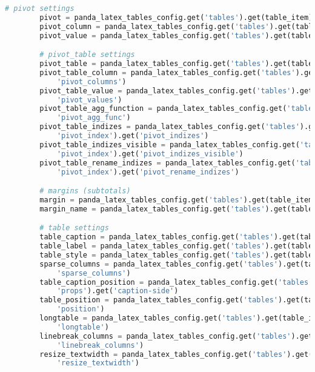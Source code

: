 \begin{lstlisting}[language=python, caption=pandas_dataframe_to_latex_table.py CSV - LaTex Tabelle,captionpos=b,label={lst:Python LaTex - pandas_dataframe_to_latex_table},breaklines=true]
        # pivot settings
        pivot = panda_latex_tables_config.get('tables').get(table_item).get('pivot')
        pivot_column = panda_latex_tables_config.get('tables').get(table_item).get('pivot_columns')
        pivot_value = panda_latex_tables_config.get('tables').get(table_item).get('pivot_values')

        # pivot_table settings
        pivot_table = panda_latex_tables_config.get('tables').get(table_item).get('pivot_table')
        pivot_table_column = panda_latex_tables_config.get('tables').get(table_item).get('pivot_table').get(
            'pivot_columns')
        pivot_table_value = panda_latex_tables_config.get('tables').get(table_item).get('pivot_table').get(
            'pivot_values')
        pivot_table_agg_function = panda_latex_tables_config.get('tables').get(table_item).get('pivot_table').get(
            'pivot_agg_func')
        pivot_table_indizes = panda_latex_tables_config.get('tables').get(table_item).get('pivot_table').get(
            'pivot_index').get('pivot_indizes')
        pivot_table_indizes_visible = panda_latex_tables_config.get('tables').get(table_item).get('pivot_table').get(
            'pivot_index').get('pivot_indizes_visible')
        pivot_table_rename_indizes = panda_latex_tables_config.get('tables').get(table_item).get('pivot_table').get(
            'pivot_index').get('pivot_rename_indizes')

        # margins (subtotals)
        margin = panda_latex_tables_config.get('tables').get(table_item).get('margins').get('margin')
        margin_name = panda_latex_tables_config.get('tables').get(table_item).get('margins').get('margin_name')

        # table settings
        table_caption = panda_latex_tables_config.get('tables').get(table_item).get('caption')
        table_label = panda_latex_tables_config.get('tables').get(table_item).get('label')
        table_style = panda_latex_tables_config.get('tables').get(table_item).get('table_styles')
        sparse_columns = panda_latex_tables_config.get('tables').get(table_item).get('table_styles').get(
            'sparse_columns')
        table_caption_position = panda_latex_tables_config.get('tables').get(table_item).get('table_styles').get(
            'props').get('caption-side')
        table_position = panda_latex_tables_config.get('tables').get(table_item).get('table_styles').get('props').get(
            'position')
        longtable = panda_latex_tables_config.get('tables').get(table_item).get('table_styles').get('props').get(
            'longtable')
        linebreak_columns = panda_latex_tables_config.get('tables').get(table_item).get('table_styles').get('props').get(
            'linebreak_columns')
        resize_textwidth = panda_latex_tables_config.get('tables').get(table_item).get('table_styles').get('props').get(
            'resize_textwidth')


\end{lstlisting}
